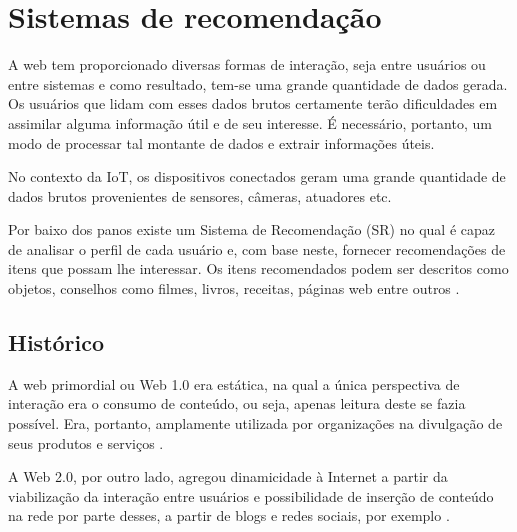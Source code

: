 \chapter{Sistemas de recomendação}
\label{cap:sistemas_de_recomendacao}



A web tem proporcionado diversas formas de interação, seja entre usuários ou entre sistemas e como resultado, tem-se uma grande quantidade de dados gerada. Os usuários que lidam com esses dados brutos certamente terão dificuldades em assimilar alguma informação útil e de seu interesse. É necessário, portanto, um modo de processar tal montante de dados e extrair informações úteis. 

No contexto da IoT, os dispositivos conectados geram uma grande quantidade de dados brutos provenientes de sensores, câmeras, atuadores etc.


Por baixo dos panos existe um Sistema de Recomendação (SR) no qual é capaz de analisar o perfil de cada usuário e, com base neste, fornecer recomendações de itens que possam lhe interessar. Os itens recomendados podem ser descritos como objetos, conselhos como filmes, livros, receitas, páginas web entre outros \cite{Bobadilla_2013}.

\section{Histórico}

A web primordial ou Web 1.0 era estática, na qual a única perspectiva de interação era o consumo de conteúdo, ou seja, apenas leitura deste se fazia possível. Era, portanto, amplamente utilizada por organizações na divulgação de seus produtos e serviços \cite{Aghaei2012}. 

A Web 2.0, por outro lado, agregou dinamicidade à Internet a partir da viabilização da interação entre usuários e possibilidade de inserção de conteúdo na rede por parte desses, a partir de blogs e redes sociais, por exemplo \cite{Nath2014}.

